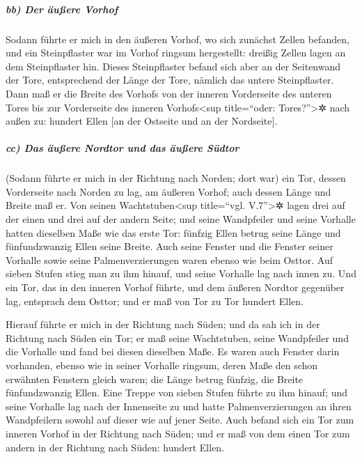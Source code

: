 \hypertarget{bb-der-uxe4uuxdfere-vorhof}{%
\subparagraph{bb) Der äußere Vorhof}\label{bb-der-uxe4uuxdfere-vorhof}}

Sodann führte er mich in den äußeren Vorhof, wo sich
zunächst Zellen befanden, und ein Steinpflaster war im Vorhof ringsum
hergestellt: dreißig Zellen lagen an dem Steinpflaster hin.
Dieses Steinpflaster befand sich aber an der Seitenwand
der Tore, entsprechend der Länge der Tore, nämlich das untere
Steinpflaster. Dann maß er die Breite des Vorhofs von der
inneren Vorderseite des unteren Tores bis zur Vorderseite des inneren
Vorhofs\textless sup title=``oder: Tores?''\textgreater✲ nach außen zu:
hundert Ellen {[}an der Ostseite und an der Nordseite{]}.

\hypertarget{cc-das-uxe4uuxdfere-nordtor-und-das-uxe4uuxdfere-suxfcdtor}{%
\subparagraph{cc) Das äußere Nordtor und das äußere
Südtor}\label{cc-das-uxe4uuxdfere-nordtor-und-das-uxe4uuxdfere-suxfcdtor}}

(Sodann führte er mich in der Richtung nach Norden; dort
war) ein Tor, dessen Vorderseite nach Norden zu lag, am äußeren Vorhof;
auch dessen Länge und Breite maß er. Von seinen
Wachtstuben\textless sup title=``vgl. V.7''\textgreater✲ lagen drei auf
der einen und drei auf der andern Seite; und seine Wandpfeiler und seine
Vorhalle hatten dieselben Maße wie das erste Tor: fünfzig Ellen betrug
seine Länge und fünfundzwanzig Ellen seine Breite. Auch
seine Fenster und die Fenster seiner Vorhalle sowie seine
Palmenverzierungen waren ebenso wie beim Osttor. Auf sieben Stufen stieg
man zu ihm hinauf, und seine Vorhalle lag nach innen zu.
Und ein Tor, das in den inneren Vorhof führte, und dem
äußeren Nordtor gegenüber lag, entsprach dem Osttor; und er maß von Tor
zu Tor hundert Ellen.

Hierauf führte er mich in der Richtung nach Süden; und da
sah ich in der Richtung nach Süden ein Tor; er maß seine Wachtstuben,
seine Wandpfeiler und die Vorhalle und fand bei diesen dieselben Maße.
Es waren auch Fenster darin vorhanden, ebenso wie in
seiner Vorhalle ringsum, deren Maße den schon erwähnten Fenstern gleich
waren; die Länge betrug fünfzig, die Breite fünfundzwanzig Ellen.
Eine Treppe von sieben Stufen führte zu ihm hinauf; und
seine Vorhalle lag nach der Innenseite zu und hatte Palmenverzierungen
an ihren Wandpfeilern sowohl auf dieser wie auf jener Seite.
Auch befand sich ein Tor zum inneren Vorhof in der
Richtung nach Süden; und er maß von dem einen Tor zum andern in der
Richtung nach Süden: hundert Ellen.

